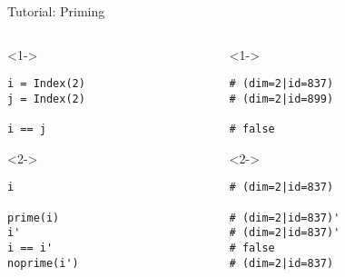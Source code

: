 \begin{frame}[fragile]{Tutorial: Priming}

\begin{columns}

\begin{column}{4.5cm}

\begin{onlyenv}<1->

\begin{lstlisting}[language=JuliaLocal, style=julia, basicstyle=\small]
i = Index(2)
j = Index(2)

i == j
\end{lstlisting}

\end{onlyenv}

\begin{onlyenv}<2->

\begin{lstlisting}[language=JuliaLocal, style=julia, basicstyle=\small]
i

prime(i)
i'
i == i'
noprime(i')
\end{lstlisting}

\end{onlyenv}

\end{column}

\begin{column}{4.5cm}

\begin{onlyenv}<1->

\begin{lstlisting}[style=julia, numbers=none, mathescape, basicstyle=\small]
# (dim=2|id=837)
# (dim=2|id=899)

# false
\end{lstlisting}

\end{onlyenv}

\begin{onlyenv}<2->

\begin{lstlisting}[style=julia, numbers=none, mathescape, basicstyle=\small]
# (dim=2|id=837)

# (dim=2|id=837)'
# (dim=2|id=837)'
# false
# (dim=2|id=837)
\end{lstlisting}

\end{onlyenv}

\end{column}

\end{columns}

\end{frame}
